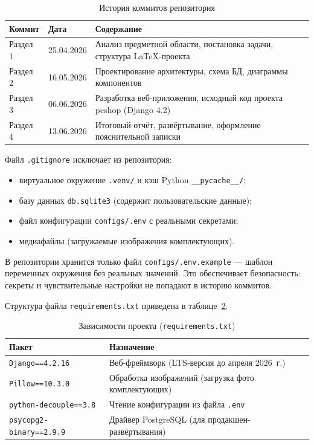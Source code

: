 \documentclass[14pt, a4paper]{extarticle}
\begin{document}
\begin{table}[ht!]
\caption{История коммитов репозитория}
\label{tab:commits}
\small
\begin{tabularx}{\textwidth}{|p{}|p{}|>{\RaggedRight\arraybackslash}X|}
\hline
\textbf{Коммит} & \textbf{Дата} & \textbf{Содержание} \\ \hline
Раздел 1 & 25.04.2026 & Анализ предметной области, постановка задачи, структура LaTeX-проекта \\ \hline
Раздел 2 & 16.05.2026 & Проектирование архитектуры, схема БД, диаграммы компонентов \\ \hline
Раздел 3 & 06.06.2026 & Разработка веб-приложения, исходный код проекта pcshop (Django 4.2) \\ \hline
Раздел 4 & 13.06.2026 & Итоговый отчёт, развёртывание, оформление пояснительной записки \\ \hline
\end{tabularx}
\end{table}

Файл \texttt{.gitignore} исключает из репозитория:
\begin{itemize}
    \item виртуальное окружение \texttt{.venv/} и кэш Python \texttt{\_\_pycache\_\_/};
    \item базу данных \texttt{db.sqlite3} (содержит пользовательские данные);
    \item файл конфигурации \texttt{configs/.env} с реальными секретами;
    \item медиафайлы (загружаемые изображения комплектующих).
\end{itemize}

В репозитории хранится только файл \texttt{configs/.env.example} --- шаблон переменных окружения без реальных значений. Это обеспечивает безопасность: секреты и чувствительные настройки не попадают в историю коммитов.

Структура файла \texttt{requirements.txt} приведена в таблице~\ref{tab:requirements}.

\begin{table}[ht!]
\caption{Зависимости проекта (\texttt{requirements.txt})}
\label{tab:requirements}
\small
\begin{tabularx}{\textwidth}{|>{\RaggedRight\arraybackslash}p{}|>{\RaggedRight\arraybackslash}X|}
\hline
\textbf{Пакет} & \textbf{Назначение} \\ \hline
\texttt{Django==4.2.16} & Веб-фреймворк (LTS-версия до апреля 2026~г.) \\ \hline
\texttt{Pillow==10.3.0} & Обработка изображений (загрузка фото комплектующих) \\ \hline
\texttt{python-decouple==3.8} & Чтение конфигурации из файла \texttt{.env} \\ \hline
\texttt{psycopg2-binary==2.9.9} & Драйвер PostgreSQL (для продакшен-развёртывания) \\ \hline
\end{tabularx}
\end{table}
\end{document}
